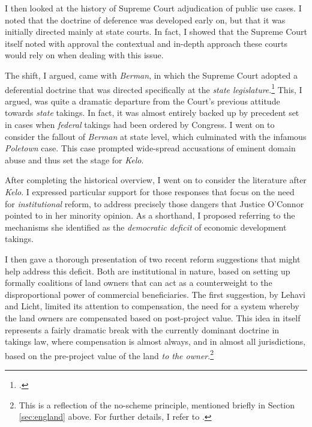 I then looked at the history of Supreme Court adjudication of public use cases. I noted that the doctrine of deference was developed early on, but that it was initially directed mainly at state courts. In fact, I showed that the Supreme Court itself noted with approval the contextual and in-depth approach these courts would rely on when dealing with this issue.

The shift, I argued, came with {\it Berman}, in which the Supreme Court adopted a deferential doctrine that was directed specifically at the {\it state legislature}.\footcite{berman54} This, I argued, was quite a dramatic departure from the Court's previous attitude towards {\it state} takings. In fact, it was almost entirely backed up by precedent set in cases when {\it federal} takings had been ordered by Congress. I went on to consider the fallout of {\it Berman} at state level, which culminated with the infamous {\it Poletown} case. This case prompted wide-spread accusations of eminent domain abuse and thus set the stage for {\it Kelo}.

After completing the historical overview, I went on to consider the literature after {\it Kelo}. I expressed particular support for those responses that focus on the need for {\it institutional} reform, to address precisely those dangers that Justice O'Connor pointed to in her minority opinion. As a shorthand, I proposed referring to the mechanisms she identified as the {\it democratic deficit} of economic development takings. 

I then gave a thorough presentation of two recent reform suggestions that might help address this deficit. Both are institutional in nature, based on setting up formally  coalitions of land owners that can act as a counterweight to the disproportional power of commercial beneficiaries. The first suggestion, by Lehavi and Licht, limited its attention to compensation,  the need for a system whereby the land owners are compensated based on post-project value.  This idea in itself represents a fairly dramatic break with the currently dominant doctrine in takings law, where compensation is almost always, and in almost all jurisdictions, based on the pre-project value of the land {\it to the owner}.\footnote{This is a reflection of the no-scheme principle, mentioned briefly in Section \ref{sec:england} above. For further details, I refer to \cite{dyrkolbotn15}.}

